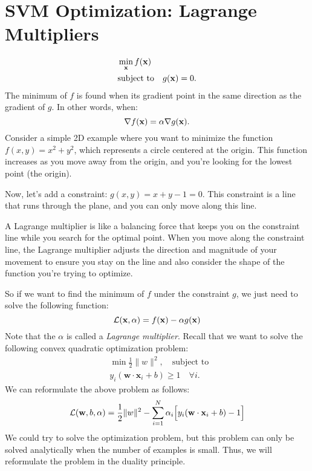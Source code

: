 \section{SVM Optimization: Lagrange Multipliers}
\label{sec:svm_optimization}

\begin{align*}
&\min_{{\mathbf{x}}} f({\mathbf{x}}) \\
&\textrm{subject to}\quad g({\mathbf{x}})=0.\\
\end{align*}
The minimum of $f$ is found when its gradient point in the same direction as the gradient of $g$. In other words, when:  
$$\nabla f({\mathbf{x}}) = \alpha\nabla g({\mathbf{x}}).$$
Consider a simple 2D example where you want to minimize the function $f(x,y)=x^2+y^2$, which represents a circle centered at the origin. This function increases as you move away from the origin, and you're looking for the lowest point (the origin).

Now, let's add a constraint: $g(x,y)=x+y-1=0$. This constraint is a line that runs through the plane, and you can only move along this line.

A Lagrange multiplier is like a balancing force that keeps you on the constraint line while you search for the optimal point. When you move along the constraint line, the Lagrange multiplier adjusts the direction and magnitude of your movement to ensure you stay on the line and also consider the shape of the function you're trying to optimize.

So if we want to find the minimum of $f$ under the constraint $g$, we just need to solve the following function: 
$$\mathcal{L}({\mathbf{x}}, \alpha) = f({\mathbf{x}}) - \alpha g({\mathbf{x}})$$
Note that the $\alpha$ is called a \textit{Lagrange multiplier}. Recall that we want to solve the following convex quadratic optimization problem:
\begin{align*}
	&\min \frac{1}{2}\|w\|^2,\quad \textrm{subject to } \\
	&y_i(\mathbf{w}\cdot \mathbf{x}_i+b)\geq 1 \quad\forall i.
\end{align*}
We can reformulate the above problem as follows:
\begin{align}
	\mathcal{L}({\mathbf{w}}, b, \alpha) = \frac{1}{2}\|w\|^2 - \sum_{i=1}^N \alpha_i \Big[y_i(\mathbf{w}\cdot \mathbf{x}_i+b)-1\Big]
	\label{eq:objective_function}
\end{align}
We could try to solve the optimization problem, but this problem can only be solved analytically when the number of examples is small. Thus, we will reformulate the problem in the duality principle. 

